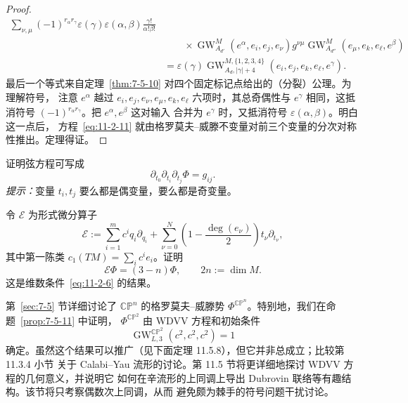 \begin{proof}
\[\begin{aligned}
  \sum_{\nu,\mu}
  (-1)^{r_\alpha r_\gamma}
  \varepsilon(\gamma)\varepsilon(\alpha,\beta)
  \frac{\gamma!}{\alpha!\beta!}\\
  &\qquad{}\times
  \operatorname{GW}_{A_{d'}}^M(e^\alpha,e_i,e_j,e_\nu)g^{\nu\mu}
  \operatorname{GW}_{A_{d''}}^M(e_\mu,e_k,e_\ell,e^\beta)\\
  &=
  \varepsilon(\gamma)
  \operatorname{GW}_{A_d,|\gamma|+4}^{M,\{1,2,3,4\}}
  (e_i,e_j,e_k,e_\ell,e^\gamma).
\end{aligned}
\]
最后一个等式来自定理~\ref{thm:7-5-10} 对四个固定标记点给出的（分裂）公理。为理解符号，
注意 $e^\alpha$ 越过 $e_i,e_j,e_\nu,e_\mu,e_k,e_\ell$ 六项时，其总奇偶性与
$e^\gamma$ 相同，这抵消符号 $(-1)^{r_\alpha r_\gamma}$。把 $e^\alpha,e^\beta$ 这对输入
合并为 $e^\gamma$ 时，又抵消符号 $\varepsilon(\alpha,\beta)$。明白这一点后，
方程~\eqref{eq:11-2-11} 就由格罗莫夫--威滕不变量对前三个变量的分次对称性推出。定理得证。
\end{proof}

\begin{exercise}\label{ex:11-2-5}
证明弦方程可写成
\begin{equation}\label{eq:11-2-13}
  \partial_{t_0}\partial_{t_i}\partial_{t_j}\Phi=g_{ij}.
\end{equation}
\emph{提示：}变量 $t_i,t_j$ 要么都是偶变量，要么都是奇变量。
\end{exercise}

\begin{exercise}\label{ex:11-2-6}
令 $\mathcal E$ 为形式微分算子
\[
  \mathcal E:=
  \sum_{i=1}^mc^iq_i\partial_{q_i}
  +\sum_{\nu=0}^N
  \left(1-\frac{\deg(e_\nu)}2\right)t_\nu\partial_{t_\nu},
\]
其中第一陈类 $c_1(TM)=\sum_i c^ie_i$。证明
\[
  \mathcal E\Phi=(3-n)\Phi,\qquad 2n:=\dim M.
\]
这是维数条件~\eqref{eq:11-2-6} 的结果。
\end{exercise}

第~\ref{sec:7-5} 节详细讨论了 $\mathbb{CP}^n$ 的格罗莫夫--威滕势
$\Phi^{\mathbb{CP}^n}$。特别地，我们在命题~\ref{prop:7-5-11} 中证明，
$\Phi^{\mathbb{CP}^2}$ 由 WDVV 方程和初始条件
\[
  \operatorname{GW}_{L,3}^{\mathbb{CP}^2}(c^2,c^2,c^2)=1
\]
确定。虽然这个结果可以推广（见下面定理 11.5.8），但它并非总成立；比较第 11.3.4 小节
关于 Calabi--Yau 流形的讨论。第 11.5 节将更详细地探讨 WDVV 方程的几何意义，并说明它
如何在辛流形的上同调上导出 Dubrovin 联络等有趣结构。该节将只考察偶数次上同调，从而
避免颇为棘手的符号问题干扰讨论。
